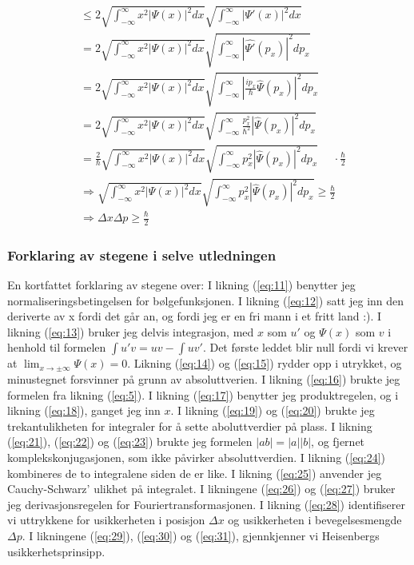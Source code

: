 \documentclass{article}
\begin{document}
\begin{align}
    &\leq 2 \sqrt{\int_{-\infty}^{\infty} x^2 |\Psi(x)|^2 dx} \sqrt{\int_{-\infty}^{\infty} |\Psi'(x)|^2 dx} \label{eq:25}\\
    &= 2 \sqrt{\int_{-\infty}^{\infty} x^2 |\Psi(x)|^2 dx} \sqrt{\int_{-\infty}^{\infty} |\widehat{\Psi'}(p_x)|^2 dp_x} \label{eq:26}\\
    &= 2 \sqrt{\int_{-\infty}^{\infty} x^2 |\Psi(x)|^2 dx} \sqrt{\int_{-\infty}^{\infty} \left|\frac{ip_x}{\hbar} \widehat{\Psi}(p_x)\right|^2 dp_x} \label{eq:27}\\
    &= 2 \sqrt{\int_{-\infty}^{\infty} x^2 |\Psi(x)|^2 dx} \sqrt{\int_{-\infty}^{\infty} \frac{p_x^2}{\hbar^2} |\widehat{\Psi}(p_x)|^2 dp_x} \label{eq:28}\\
    &= \frac{2}{\hbar} \sqrt{\int_{-\infty}^{\infty} x^2 |\Psi(x)|^2 dx} \sqrt{\int_{-\infty}^{\infty} p_x^2 |\widehat{\Psi}(p_x)|^2 dp_x} \,\,\,\,\,\,\,\,  \cdot\frac{\hbar}{2} \label{eq:29}\\
    &\Rightarrow \sqrt{\int_{-\infty}^{\infty} x^2 |\Psi(x)|^2 dx} \sqrt{\int_{-\infty}^{\infty} p_x^2 |\widehat{\Psi}(p_x)|^2 dp_x} \geq \frac{\hbar}{2} \label{eq:30}\\
    &\Rightarrow \Delta x \Delta p \geq \frac{\hbar}{2} \label{eq:31} 
\end{align}




\subsubsection{Forklaring av stegene i selve utledningen}
En kortfattet forklaring av stegene over: I likning (\ref{eq:11}) benytter jeg normaliseringsbetingelsen for bølgefunksjonen. I likning (\ref{eq:12}) satt jeg inn den deriverte av x fordi det går an, og fordi jeg er en fri mann i et fritt land :). I likning (\ref{eq:13}) bruker jeg delvis integrasjon, med $x$ som $u'$ og $\Psi(x)$ som $v$ i henhold til formelen $\int u' v = uv - \int uv'$. Det første leddet blir null fordi vi krever at $\lim_{x\to\pm\infty} \Psi(x)=0$. Likning (\ref{eq:14}) og (\ref{eq:15}) rydder opp i utrykket, og minustegnet forsvinner på grunn av absoluttverien. I likning (\ref{eq:16}) brukte jeg formelen fra likning (\ref{eq:5}). I likning (\ref{eq:17}) benytter jeg produktregelen, og i likning (\ref{eq:18}), ganget jeg inn $x$. I likning (\ref{eq:19}) og (\ref{eq:20}) brukte jeg trekantulikheten for integraler for å sette aboluttverdier på plass. I likning (\ref{eq:21}), (\ref{eq:22}) og (\ref{eq:23}) brukte jeg formelen $|ab| = |a||b|$, og fjernet komplekskonjugasjonen, som ikke påvirker absoluttverdien. I likning (\ref{eq:24}) kombineres de to integralene siden de er like. I likning (\ref{eq:25}) anvender jeg Cauchy-Schwarz' ulikhet på integralet. I likningene (\ref{eq:26}) og (\ref{eq:27}) bruker jeg derivasjonsregelen for Fouriertransformasjonen. I likning (\ref{eq:28}) identifiserer vi uttrykkene for usikkerheten i posisjon $\Delta x$ og usikkerheten i bevegelsesmengde $\Delta p$. I likningene (\ref{eq:29}), (\ref{eq:30}) og (\ref{eq:31}), gjennkjenner vi Heisenbergs usikkerhetsprinsipp. 
\end{document}
